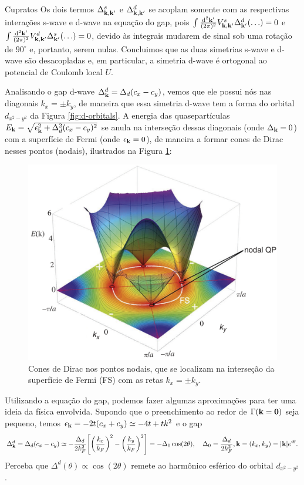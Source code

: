 \documentclass[a4paper,10pt]{article}
\begin{document}
\begin{section}{Cupratos}
Os dois termos $\Delta_{\vb{k},\vb{k}'}^s$ e $\Delta_{\vb{k},\vb{k}'}^d$ se acoplam somente com as respectivas interações s-wave e d-wave na equação do gap, pois $\int \frac{\dd[2]{\vb{k}'}}{(2\pi)^2} V_{\vb{k},\vb{k}'}^s \Delta^d_{\vb{k}'} (\ldots) = 0$ e $\int \frac{\dd[2]{\vb{k}'}}{(2\pi)^2} V_{\vb{k},\vb{k}'}^d \Delta^s_{\vb{k}'} (\ldots) = 0$, devido às integrais mudarem de sinal sob uma rotação de $90^\circ$ e, portanto, serem nulas. Concluimos que as duas simetrias s-wave e d-wave são desacopladas e, em particular, a simetria d-wave é ortogonal ao potencial de Coulomb local $U$.



\n

Analisando o gap d-wave $\Delta_{\vb{k}}^d = \Delta_d (c_x - c_y)$, vemos que ele possui nós nas diagonais $k_x = \pm k_y$, de maneira que essa simetria d-wave tem a forma do orbital $d_{x^2-y^2}$ da Figura \ref{fig:d-orbitals}. A energia das quasepartículas $E_{\vb{k}} = \sqrt{\epsilon_{\vb{k}}^2 + \Delta_d^2 (c_x - c_y)^2}$ se anula na interseção dessas diagonais (onde $\Delta_{\vb{k}} = 0$) com a superfície de Fermi (onde $\epsilon_{\vb{k}} = 0$), de maneira a formar cones de Dirac nesses pontos (nodais), ilustrados na Figura \ref{fig:fermisurf}:

\begin{figure}[H]
\centering
\includegraphics[width=0.45\linewidth]{fig/fermisurf.png}
\caption{Cones de Dirac nos pontos nodais, que se localizam na interseção da superfície de Fermi (FS) com as retas $k_x = \pm k_y$.}
\label{fig:fermisurf}
\end{figure}



Utilizando a equação do gap, podemos fazer algumas aproximações para ter uma ideia da física envolvida. Supondo que o preenchimento ao redor de $\Gamma (\vb{k} = \vb{0})$ seja pequeno, temos $\epsilon_{\vb{k}} = -2t (c_x + c_y) \simeq -4t  + t k^2$ e o gap
$$
\Delta_{\vb{k}}^d = \Delta_d (c_x - c_y) \simeq -\frac{\Delta_d}{2 k_F^2}
\qty[\qty(\frac{k_x}{k_F})^2 - \qty(\frac{k_y}{k_F})^2] = - \Delta_0 \cos(2\theta),
\quad \Delta_0 = \frac{\Delta_d}{2 k_F^2}, \vb{k} = (k_x, k_y) = \abs{\vb{k}} e^{i\theta}.
$$
Perceba que $\Delta^d(\theta) \propto \cos(2\theta)$ remete ao harmônico esférico do orbital $d_{x^2 - y^2}$.


\end{section}
\end{document}
